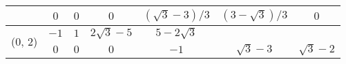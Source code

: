 \begin{table}[htbp]
\begin{tabular}{ccccccc}
     & $0$                        & $0$                        & $0$
     & $(\sqrt3-3) /3$            & $(3-\sqrt3) /3$            & $0$                                                   \\
    \midrule
    \multirow{2}{*}{(0, 2)}
     & $-1$                       & $1$                        & $2\sqrt3-5$                & $5-2\sqrt3$              \\
     & $0$                        & $0$                        & $0$
     & $-1$                       & $\sqrt3-3$                 & $\sqrt3-2$                                            \\
    \bottomrule
  \end{tabular}
\end{table}